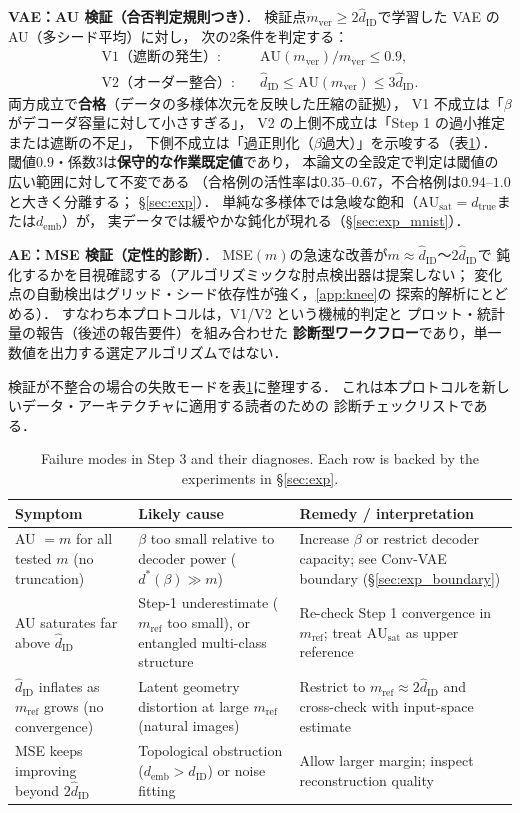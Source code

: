 \documentclass[11pt,a4paper]{jsarticle}
\newcommand{\dID}{d_{\mathrm{ID}}}
\newcommand{\hatdID}{\hat{d}_{\mathrm{ID}}}
\newcommand{\dtrue}{d_{\mathrm{true}}}
\newcommand{\AUsat}{\mathrm{AU}_{\mathrm{sat}}}
\newcommand{\demb}{d_{\mathrm{emb}}}
\newcommand{\dstar}{d^{*}(\beta)}
\begin{document}
\textbf{VAE：AU 検証（合否判定規則つき）}．
検証点$m_{\mathrm{ver}} \geq 2\hatdID$で学習した VAE の AU（多シード平均）に対し，
次の2条件を判定する：
\begin{align}
  \text{V1（遮断の発生）}:&\quad \mathrm{AU}(m_{\mathrm{ver}}) / m_{\mathrm{ver}} \leq 0.9,
  \label{eq:rule_v1}\\
  \text{V2（オーダー整合）}:&\quad \hatdID \leq \mathrm{AU}(m_{\mathrm{ver}}) \leq 3\hatdID.
  \label{eq:rule_v2}
\end{align}
両方成立で\textbf{合格}（データの多様体次元を反映した圧縮の証拠），
V1 不成立は「$\beta$がデコーダ容量に対して小さすぎる」，
V2 の上側不成立は「Step 1 の過小推定または遮断の不足」，
下側不成立は「過正則化（$\beta$過大）」を示唆する（表\ref{tab:failure}）．
閾値$0.9$・係数$3$は\textbf{保守的な作業既定値}であり，
本論文の全設定で判定は閾値の広い範囲に対して不変である
（合格例の活性率は$0.35$--$0.67$，不合格例は$0.94$--$1.0$と大きく分離する；
§\ref{sec:exp}）．
単純な多様体では急峻な飽和（$\AUsat = \dtrue$または$\demb$）が，
実データでは緩やかな鈍化が現れる（§\ref{sec:exp_mnist}）．

\textbf{AE：MSE 検証（定性的診断）}．
MSE$(m)$の急速な改善が$m \approx \hatdID$〜$2\hatdID$で
鈍化するかを目視確認する（アルゴリズミックな肘点検出器は提案しない；
変化点の自動検出はグリッド・シード依存性が強く，\ref{app:knee}の
探索的解析にとどめる）．
すなわち本プロトコルは，V1/V2 という機械的判定と
プロット・統計量の報告（後述の報告要件）を組み合わせた
\textbf{診断型ワークフロー}であり，単一数値を出力する選定アルゴリズムではない．

検証が不整合の場合の失敗モードを表\ref{tab:failure}に整理する．
これは本プロトコルを新しいデータ・アーキテクチャに適用する読者のための
診断チェックリストである．

\begin{table}[H]
\centering
\caption{Failure modes in Step 3 and their diagnoses. Each row is backed by
the experiments in §\ref{sec:exp}.}
\label{tab:failure}
\small
\begin{tabular}{p{4.2cm}p{4.6cm}p{4.6cm}}
\toprule
Symptom & Likely cause & Remedy / interpretation \\
\midrule
AU $= m$ for all tested $m$ (no truncation) & $\beta$ too small relative to decoder power ($\dstar \gg m$) & Increase $\beta$ or restrict decoder capacity; see Conv-VAE boundary (§\ref{sec:exp_boundary}) \\
AU saturates far above $\hatdID$ & Step-1 underestimate ($m_{\mathrm{ref}}$ too small), or entangled multi-class structure & Re-check Step 1 convergence in $m_{\mathrm{ref}}$; treat $\AUsat$ as upper reference \\
$\hatdID$ inflates as $m_{\mathrm{ref}}$ grows (no convergence) & Latent geometry distortion at large $m_{\mathrm{ref}}$ (natural images) & Restrict to $m_{\mathrm{ref}} \approx 2\hatdID$ and cross-check with input-space estimate \\
MSE keeps improving beyond $2\hatdID$ & Topological obstruction ($\demb > \dID$) or noise fitting & Allow larger margin; inspect reconstruction quality \\
\bottomrule
\end{tabular}
\end{table}
\end{document}
